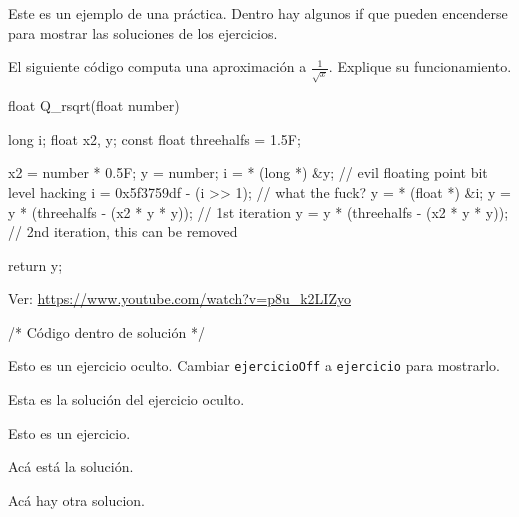 \documentclass[debug,practica]{lcc}
\begin{document}
\maketitle

Este es un ejemplo de una práctica. Dentro hay algunos if que pueden
encenderse para mostrar las soluciones de los ejercicios.

\begin{ejercicio}
    El siguiente código computa una aproximación a
    $\frac{1}{\sqrt{x}}$. Explique su funcionamiento.
    \begin{C}
float Q_rsqrt(float number)
{
    long i;
    float x2, y;
    const float threehalfs = 1.5F;

    x2 = number * 0.5F;
    y  = number;
    i  = * (long *) &y;                   // evil floating point bit level hacking
    i  = 0x5f3759df - (i >> 1);           // what the fuck?
    y  = * (float *) &i;
    y  = y * (threehalfs - (x2 * y * y)); // 1st iteration
    y  = y * (threehalfs - (x2 * y * y)); // 2nd iteration, this can be removed

    return y;
}
    \end{C}
    \begin{solucion}
        Ver: \url{https://www.youtube.com/watch?v=p8u_k2LIZyo}
        \begin{C}
/* Código dentro de solución */
        \end{C}
    \end{solucion}
\end{ejercicio}

\begin{ejercicioOff}
    Esto es un ejercicio oculto. Cambiar \texttt{ejercicioOff} a
    \texttt{ejercicio} para mostrarlo.
    \begin{solucion}
        Esta es la solución del ejercicio oculto.
    \end{solucion}
\end{ejercicioOff}

\begin{ejercicio}
    \label{ej1}
    Esto es un ejercicio.
    \begin{solucion}
        Acá está la solución.
    \end{solucion}
    \begin{solucion}[variante 2]
        Acá hay otra solucion.
    \end{solucion}
\end{ejercicio}
\end{document}
